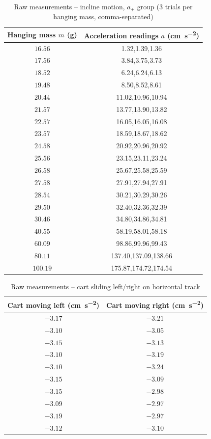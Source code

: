 \begin{table}[htb!]
\centering
\caption{Raw measurements -- incline motion, $a_{+}$ group (3 trials per hanging mass, comma-separated)}
\begin{tabular}{cc}
\toprule
Hanging mass $m$ (\unit{\g}) & Acceleration readings $a$ (\unit{\cm\per\s\squared}) \\
\midrule
$16.56$ & 1.32,1.39,1.36 \\
$17.56$ & 3.84,3.75,3.73 \\
$18.52$ & 6.24,6.24,6.13 \\
$19.48$ & 8.50,8.52,8.61 \\
$20.44$ & 11.02,10.96,10.94 \\
$21.57$ & 13.77,13.90,13.82 \\
$22.57$ & 16.05,16.05,16.08 \\
$23.57$ & 18.59,18.67,18.62 \\
$24.58$ & 20.92,20.96,20.92 \\
$25.56$ & 23.15,23.11,23.24 \\
$26.58$ & 25.67,25.58,25.59 \\
$27.58$ & 27.91,27.94,27.91 \\
$28.54$ & 30.21,30.29,30.26 \\
$29.50$ & 32.40,32.36,32.39 \\
$30.46$ & 34.80,34.86,34.81 \\
$40.55$ & 58.19,58.01,58.18 \\
$60.09$ & 98.86,99.96,99.43 \\
$80.11$ & 137.40,137.09,138.66 \\
$100.19$ & 175.87,174.72,174.54 \\
\bottomrule
\end{tabular}
\end{table}
\begin{table}[htb!]
\centering
\caption{Raw measurements -- cart sliding left/right on horizontal track}
\begin{tabular}{cc}
\toprule
Cart moving left (\unit{\cm\per\s\squared}) & Cart moving right (\unit{\cm\per\s\squared}) \\
\midrule
$-3.17$ & $-3.21$ \\
$-3.10$ & $-3.05$ \\
$-3.15$ & $-3.13$ \\
$-3.10$ & $-3.19$ \\
$-3.10$ & $-3.24$ \\
$-3.15$ & $-3.09$ \\
$-3.15$ & $-2.98$ \\
$-3.09$ & $-2.97$ \\
$-3.19$ & $-2.97$ \\
$-3.12$ & $-3.10$ \\
\bottomrule
\end{tabular}
\end{table}
